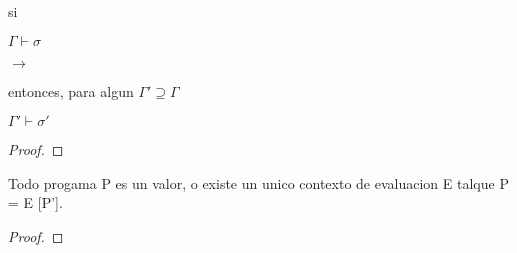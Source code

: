 \begin{theorem}[Preservacion]
    si


    $\Gamma \vdash \sigma$

      $\rightarrow$ 

    entonces, para algun $\Gamma' \supseteq  \Gamma$


    $\Gamma' \vdash \sigma'$

\end{theorem}

\begin{proof}

\end{proof}

\begin{lemma}
    Todo progama P es un valor, o existe un unico contexto de evaluacion E talque 
    P = E [P'].
\end{lemma}

\begin{proof}

\end{proof}